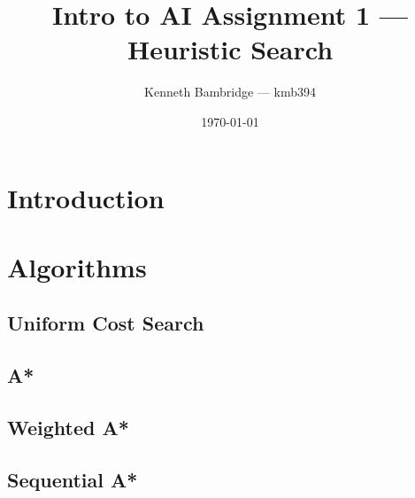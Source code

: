 \documentclass[11pt,draft]{article}
\begin{document}
\title{Intro to AI Assignment 1 --- Heuristic Search}
\author{Kenneth Bambridge --- kmb394}
\date{\today}
\maketitle
\tableofcontents

\section{Introduction}

\section{Algorithms}

\subsection{Uniform Cost Search}

\subsection{A*}

\subsection{Weighted A*}

\subsection{Sequential A*}
\end{document}
